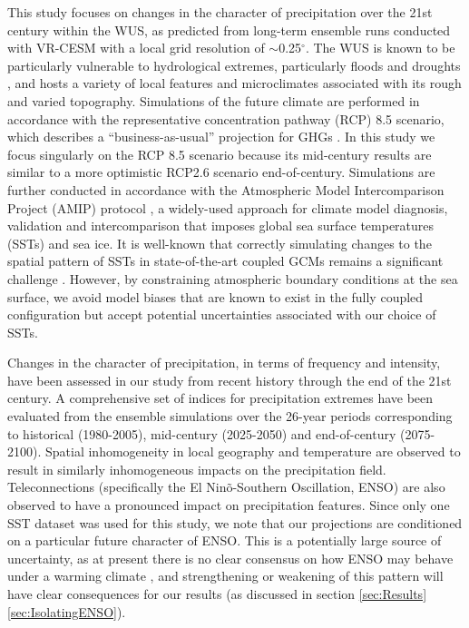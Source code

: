 This study focuses on changes in the character of precipitation over the 21st century within the WUS, as predicted from long-term ensemble runs conducted with VR-CESM with a local grid resolution of $\sim$0.25$^\circ$.  The WUS is known to be particularly vulnerable to hydrological extremes, particularly floods and droughts \cite{leung2003hydroclimate, caldwell2010california}, and hosts a variety of local features and microclimates associated with its rough and varied topography.  Simulations of the future climate are performed in accordance with the representative concentration pathway (RCP) 8.5 scenario, which describes a ``business-as-usual'' projection for GHGs \cite{riahi2011rcp}.  In this study we focus singularly on the RCP 8.5 scenario because its mid-century results are similar to a more optimistic RCP2.6 scenario end-of-century.  Simulations are further conducted in accordance with the Atmospheric Model Intercomparison Project (AMIP) protocol \cite{Gates1992}, a widely-used approach for climate model diagnosis, validation and intercomparison that imposes global sea surface temperatures (SSTs) and sea ice.  It is well-known that correctly simulating changes to the spatial pattern of SSTs in state-of-the-art coupled GCMs remains a significant challenge \cite{joseph2006enso, stevenson2012significant, jha2014sst, taschetto2014cold}.  However, by constraining atmospheric boundary conditions at the sea surface, we avoid model biases that are known to exist in the fully coupled configuration \cite{grodsky2012tropical, small2014new} but accept potential uncertainties associated with our choice of SSTs.

Changes in the character of precipitation, in terms of frequency and intensity, have been assessed in our study from recent history through the end of the 21st century.  A comprehensive set of indices for precipitation extremes have been evaluated from the ensemble simulations over the 26-year periods corresponding to historical (1980-2005), mid-century (2025-2050) and end-of-century (2075-2100). Spatial inhomogeneity in local geography and temperature are observed to result in similarly inhomogeneous impacts on the precipitation field.  Teleconnections (specifically the El Nin\~o-Southern Oscillation, ENSO) are also observed to have a pronounced impact on precipitation features.  Since only one SST dataset was used for this study, we note that our projections are conditioned on a particular future character of ENSO.  This is a potentially large source of uncertainty, as at present there is no clear consensus on how ENSO may behave under a warming climate \cite{fedorov2000nino, latif2009nino, guilyardi2009understanding, collins2010impact, dinezio2012mean}, and strengthening or weakening of this pattern will have clear consequences for our results (as discussed in section \ref{sec:Results}\ref{sec:IsolatingENSO}).


